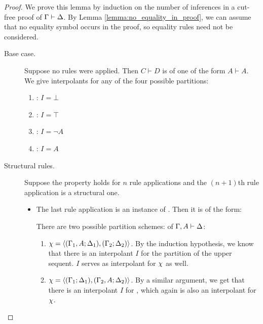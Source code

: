 \begin{proof}
	We prove this lemma by induction on the number of inferences in a cut-free proof of $\Gamma \vdash \Delta$.
	By Lemma \ref{lemma:no_equality_in_proof}, we can assume that no equality symbol occurs in the proof, so equality rules need not be considered. 
	\begin{description}
		\item[\normalfont Base case.]
			Suppose no rules were applied.
			Then $C \vdash D$ is of one of the form
				$A \vdash A$. We give interpolants for any of the four possible partitions:
					\begin{enumerate}
						\item {}: $I=\bot$
						\item {}: $I=\top$
						\item {}: $I=\lnot A$\nopagebreak
						\item {}: $I=A$
					\end{enumerate}

		\item[\normalfont Structural rules.]
			Suppose the property holds for $n$ rule applications and the $(n+1)$th rule application is a structural one.

			\begin{itemize}
				\item The last rule application is an instance of . Then it is of the form:
					\begin{prooftree}
					\end{prooftree}

					There are two possible partition schemes: of $\Gamma, A \vdash \Delta$:
					\begin{enumerate}
						\item $\chi =  \langle (\Gamma_1, A; \Delta_1),\allowbreak (\Gamma_2; \Delta_2)\rangle $.
							By the induction hypothesis, we know that there is an interpolant $I$ for the partition  of the upper sequent.
							$I$ serves as interpolant for $\chi$ as well.

						\item $\chi =  \langle (\Gamma_1; \Delta_1),\allowbreak (\Gamma_2, A; \Delta_2)\rangle $.
							By a similar argument, we get that there is an interpolant $I$ for 
							, which again is also an interpolant for $\chi$.


\end{enumerate}
\end{itemize}
\end{description}
\end{proof}

